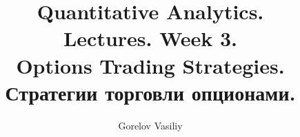 \documentclass{article}
\title{Quantitative Analytics.\\
Lectures. Week 3. \\
Options Trading Strategies.\\
Стратегии торговли опционами.}
\author{Gorelov Vasiliy}
\begin{document}
\maketitle

\setcounter{tocdepth}{1} %
\renewcommand\contentsname{Contents}
\tableofcontents
\newpage




\renewcommand{\labelitemi}{\tiny$\bullet$}
\renewcommand{\figurename}{Fig.}
\end{document}
